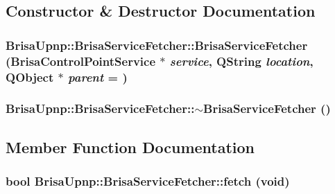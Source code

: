 \subsection{Constructor \& Destructor Documentation}
\hypertarget{classBrisaUpnp_1_1BrisaServiceFetcher_ab4596a7635b72f64a75448d9968f93e9}{
\subsubsection[{BrisaServiceFetcher}]{\setlength{\rightskip}{0pt plus 5cm}BrisaUpnp::BrisaServiceFetcher::BrisaServiceFetcher ({\bf BrisaControlPointService} $\ast$ {\em service}, \/  QString {\em location}, \/  QObject $\ast$ {\em parent} = {})}}
\label{classBrisaUpnp_1_1BrisaServiceFetcher_ab4596a7635b72f64a75448d9968f93e9}
\hypertarget{classBrisaUpnp_1_1BrisaServiceFetcher_ad45170ce91026bba8f30043b8835e623}{
\subsubsection[{$\sim$BrisaServiceFetcher}]{\setlength{\rightskip}{0pt plus 5cm}BrisaUpnp::BrisaServiceFetcher::$\sim$BrisaServiceFetcher ()}}
\label{classBrisaUpnp_1_1BrisaServiceFetcher_ad45170ce91026bba8f30043b8835e623}


\subsection{Member Function Documentation}
\hypertarget{classBrisaUpnp_1_1BrisaServiceFetcher_ab2f4e2752cd9bb75c1fdcf77895fdd1e}{
\subsubsection[{fetch}]{\setlength{\rightskip}{0pt plus 5cm}bool BrisaUpnp::BrisaServiceFetcher::fetch (void)}}
\label{classBrisaUpnp_1_1BrisaServiceFetcher_ab2f4e2752cd9bb75c1fdcf77895fdd1e}


